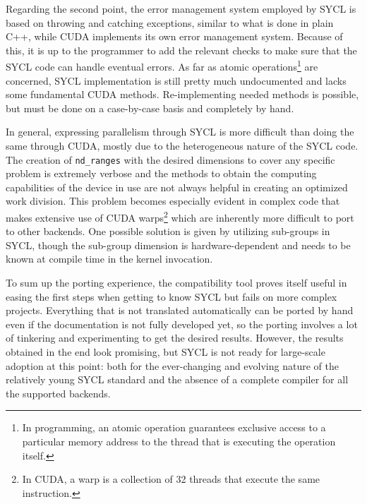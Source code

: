 Regarding the second point, the error management system employed by SYCL is based on throwing and catching exceptions, similar to what is done in plain C++, while CUDA implements its own error management system. Because of this, it is up to the programmer to add the relevant checks to make sure that the SYCL code can handle eventual errors. As far as atomic operations\footnote{In programming, an atomic operation guarantees exclusive access to a particular memory address to the thread that is executing the operation itself.} are concerned, SYCL implementation is still pretty much undocumented and lacks some fundamental CUDA methods. Re-implementing needed methods is possible, but must be done on a case-by-case basis and completely by hand. 

In general, expressing parallelism through SYCL is more difficult than doing the same through CUDA, mostly due to the heterogeneous nature of the SYCL code. The creation of \texttt{nd\_ranges} with the desired dimensions to cover any specific problem is extremely verbose and the methods to obtain the computing capabilities of the device in use are not always helpful in creating an optimized work division. This problem becomes especially evident in complex code that makes extensive use of CUDA warps\footnote{In CUDA, a warp is a collection of 32 threads that execute the same instruction.} which are inherently more difficult to port to other backends. One possible solution is given by utilizing sub-groups in SYCL, though the sub-group dimension is hardware-dependent and needs to be known at compile time in the kernel invocation.

To sum up the porting experience, the compatibility tool proves itself useful in easing the first steps when getting to know SYCL but fails on more complex projects. Everything that is not translated automatically can be ported by hand even if the documentation is not fully developed yet, so the porting involves a lot of tinkering and experimenting to get the desired results. However, the results obtained in the end look promising, but SYCL is not ready for large-scale adoption at this point: both for the ever-changing and evolving nature of the relatively young SYCL standard and the absence of a complete compiler for all the supported backends.